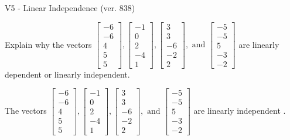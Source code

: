 \begin{exercise}
  \begin{exerciseTitle}V5 - Linear Independence (ver. 838)\end{exerciseTitle}
  \begin{exerciseStatement}
    Explain why the vectors \(\left[\begin{array}{r}
-6 \\
-6 \\
4 \\
5 \\
5
\end{array}\right] , \left[\begin{array}{r}
-1 \\
0 \\
2 \\
-4 \\
1
\end{array}\right] , \left[\begin{array}{r}
3 \\
3 \\
-6 \\
-2 \\
2
\end{array}\right] , \text{ and } \left[\begin{array}{r}
-5 \\
-5 \\
5 \\
-3 \\
-2
\end{array}\right]\) are linearly dependent or linearly independent.	


  \end{exerciseStatement}
  \begin{exerciseAnswer}
   The vectors \(\left[\begin{array}{r}
-6 \\
-6 \\
4 \\
5 \\
5
\end{array}\right] , \left[\begin{array}{r}
-1 \\
0 \\
2 \\
-4 \\
1
\end{array}\right] , \left[\begin{array}{r}
3 \\
3 \\
-6 \\
-2 \\
2
\end{array}\right] , \text{ and } \left[\begin{array}{r}
-5 \\
-5 \\
5 \\
-3 \\
-2
\end{array}\right]\) are 
  	 linearly independent  .
  


  \end{exerciseAnswer}
\end{exercise}